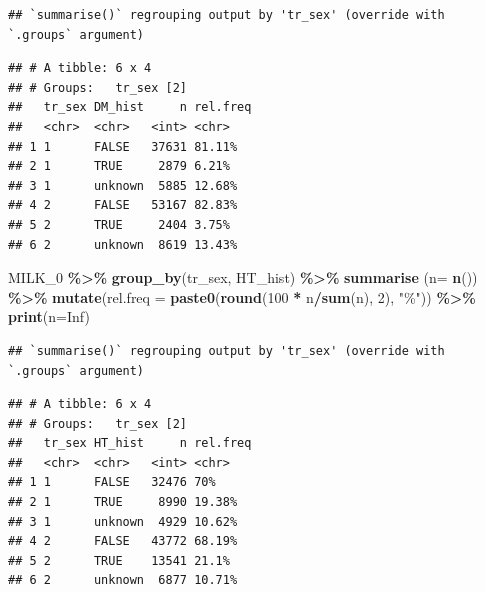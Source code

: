\documentclass[
]{article}
\newenvironment{Shaded}{\begin{snugshade}}{\end{snugshade}}
\newcommand{\DataTypeTok}[1]{\textcolor[rgb]{0.13,0.29,0.53}{#1}}
\newcommand{\DecValTok}[1]{\textcolor[rgb]{0.00,0.00,0.81}{#1}}
\newcommand{\KeywordTok}[1]{\textcolor[rgb]{0.13,0.29,0.53}{\textbf{#1}}}
\newcommand{\NormalTok}[1]{#1}
\newcommand{\OperatorTok}[1]{\textcolor[rgb]{0.81,0.36,0.00}{\textbf{#1}}}
\newcommand{\OtherTok}[1]{\textcolor[rgb]{0.56,0.35,0.01}{#1}}
\newcommand{\StringTok}[1]{\textcolor[rgb]{0.31,0.60,0.02}{#1}}
\begin{document}
\begin{verbatim}
## `summarise()` regrouping output by 'tr_sex' (override with `.groups` argument)
\end{verbatim}

\begin{verbatim}
## # A tibble: 6 x 4
## # Groups:   tr_sex [2]
##   tr_sex DM_hist     n rel.freq
##   <chr>  <chr>   <int> <chr>   
## 1 1      FALSE   37631 81.11%  
## 2 1      TRUE     2879 6.21%   
## 3 1      unknown  5885 12.68%  
## 4 2      FALSE   53167 82.83%  
## 5 2      TRUE     2404 3.75%   
## 6 2      unknown  8619 13.43%
\end{verbatim}

\begin{Shaded}
\begin{Highlighting}[]
\NormalTok{MILK\_}\DecValTok{0} \OperatorTok{\%\textgreater{}\%}\StringTok{ }
\StringTok{  }\KeywordTok{group\_by}\NormalTok{(tr\_sex, HT\_hist) }\OperatorTok{\%\textgreater{}\%}\StringTok{ }
\StringTok{  }\KeywordTok{summarise}\NormalTok{ (}\DataTypeTok{n=} \KeywordTok{n}\NormalTok{()) }\OperatorTok{\%\textgreater{}\%}
\StringTok{  }\KeywordTok{mutate}\NormalTok{(}\DataTypeTok{rel.freq =} \KeywordTok{paste0}\NormalTok{(}\KeywordTok{round}\NormalTok{(}\DecValTok{100} \OperatorTok{*}\StringTok{ }\NormalTok{n}\OperatorTok{/}\KeywordTok{sum}\NormalTok{(n), }\DecValTok{2}\NormalTok{), }\StringTok{"\%"}\NormalTok{))  }\OperatorTok{\%\textgreater{}\%}\StringTok{ }
\StringTok{  }\KeywordTok{print}\NormalTok{(}\DataTypeTok{n=}\OtherTok{Inf}\NormalTok{)}
\end{Highlighting}
\end{Shaded}

\begin{verbatim}
## `summarise()` regrouping output by 'tr_sex' (override with `.groups` argument)
\end{verbatim}

\begin{verbatim}
## # A tibble: 6 x 4
## # Groups:   tr_sex [2]
##   tr_sex HT_hist     n rel.freq
##   <chr>  <chr>   <int> <chr>   
## 1 1      FALSE   32476 70%     
## 2 1      TRUE     8990 19.38%  
## 3 1      unknown  4929 10.62%  
## 4 2      FALSE   43772 68.19%  
## 5 2      TRUE    13541 21.1%   
## 6 2      unknown  6877 10.71%
\end{verbatim}
\end{document}
